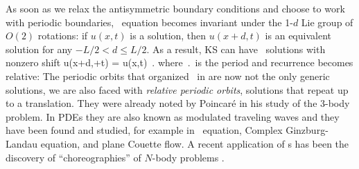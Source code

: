 %
As soon as
we relax the antisymmetric boundary conditions and choose to work with periodic boundaries,
\KS\ equation becomes invariant under the 1-$d$ Lie group of $O(2)$ rotations: if
$u(x,t)$ is a solution, then $u(x+d,t)$ is an equivalent
solution for any $-L/2 < d \leq L/2$.
As a result,
KS can have \rpo\ solutions with nonzero shift
\beq
u(x+d,\period{}+t) = u(x,t)
\,.
where $\period{}$ is the period and recurrence becomes
relative: The periodic orbits that organized \statesp\ in
 are now not the
only generic solutions, we are also faced with {\em relative
periodic orbits}, solutions that repeat up to a
translation.
They were already noted by Poincar\'e in his study of the
3-body problem. In PDEs they are also
known as modulated traveling waves and they have been found and
studied, for example in \KS\ equation, Complex
Ginzburg-Landau equation, and plane Couette
flow. A recent application of \rpo s has
been the discovery of ``choreographies'' of $N$-body problems%
.

